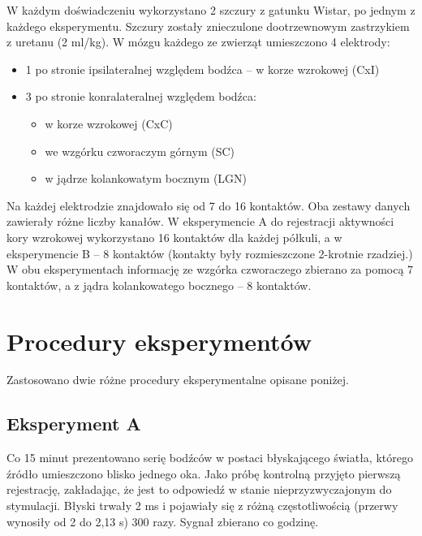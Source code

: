\documentclass{pracamgr_2}
\begin{document}
	W każdym doświadczeniu wykorzystano 2 szczury z gatunku Wistar, po jednym z każdego eksperymentu. Szczury zostały znieczulone dootrzewnowym zastrzykiem z uretanu (2 ml/kg). W mózgu każdego ze zwierząt umieszczono 4 elektrody:
	\begin{itemize}
		\item 1 po stronie ipsilateralnej względem bodźca -- w korze wzrokowej (CxI)
		\item 3 po stronie konralateralnej względem bodźca:
		\begin{itemize}
			\item w korze wzrokowej (CxC)
			\item we wzgórku czworaczym górnym (SC)
			\item w jądrze kolankowatym bocznym (LGN)
		\end{itemize}
	\end{itemize}
	Na każdej elektrodzie znajdowało się od 7 do 16 kontaktów. Oba zestawy danych zawierały różne liczby kanałów. W eksperymencie A do rejestracji aktywności kory wzrokowej wykorzystano 16 kontaktów dla każdej półkuli, a w eksperymencie B -- 8 kontaktów (kontakty były rozmieszczone 2-krotnie rzadziej.) W obu eksperymentach informację ze wzgórka czworaczego zbierano za pomocą 7 kontaktów, a z jądra kolankowatego bocznego -- 8 kontaktów. 
	\section{Procedury eksperymentów}
	Zastosowano dwie różne procedury eksperymentalne opisane poniżej.
	\subsection{Eksperyment A}
	Co 15 minut prezentowano serię bodźców w postaci błyskającego światła, którego źródło umieszczono blisko jednego oka. Jako próbę kontrolną przyjęto pierwszą rejestrację, zakładając, że jest to odpowiedź w stanie nieprzyzwyczajonym do stymulacji. Błyski trwały 2 ms i pojawiały się z różną częstotliwością (przerwy wynosiły od 2 do 2,13 s) 300 razy. Sygnał zbierano co godzinę.
\end{document}
